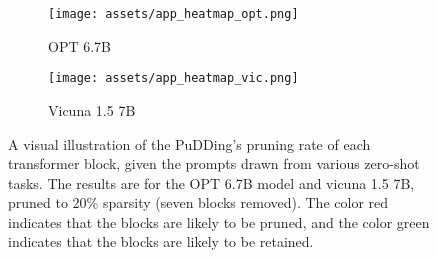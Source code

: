 \begin{figure}[h] %
    \centering

\begin{subfigure}{\textwidth} 
        \centering
        \texttt{[image: assets/app\_heatmap\_opt.png]}
        \caption{OPT 6.7B}
        \label{fig:heatmap_opt}
\end{subfigure}
\begin{subfigure}{\textwidth}
        \centering
        \texttt{[image: assets/app\_heatmap\_vic.png]}
        \caption{Vicuna 1.5 7B}
        \label{fig:heatmap_vicuna}
\end{subfigure}
    
    \caption{A visual illustration of the PuDDing's pruning rate of each transformer block, given the prompts drawn from various zero-shot tasks. The results are for the OPT 6.7B model and vicuna 1.5 7B, pruned to 20\% sparsity (seven blocks removed). The color {\color{red}red} indicates that the blocks are likely to be pruned, and the color {\color{greenish}green} indicates that the blocks are likely to be retained.}
    \label{fig:app_heatmap}
\end{figure}
